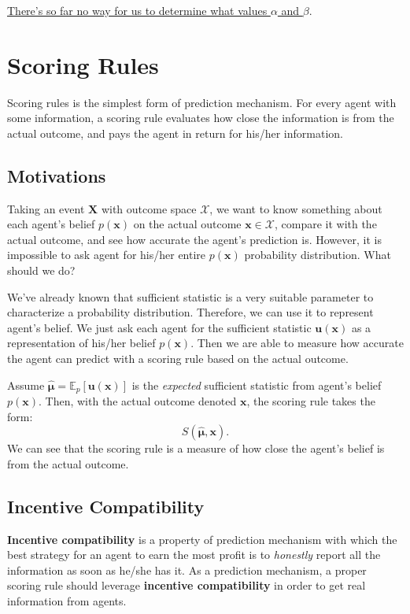 \documentclass[12pt]{article}
\begin{document}
\underline{There's so far no way for us to determine what values $\alpha$ and $\beta$}.
\newpage
\section{Scoring Rules}
Scoring rules is the simplest form of prediction mechanism. For every agent with some information, a scoring rule evaluates how close the information is from the actual outcome, and pays the agent in return for his/her information.

\subsection{Motivations}
Taking an event $\mathbf{X}$ with outcome space $\mathcal{X}$, we want to know something about each agent's belief $p(\mathbf{x})$ on the actual outcome $\mathbf{x}\in \mathcal{X}$, compare it with the actual outcome, and see how accurate the agent's prediction is. However, it is impossible to ask agent for his/her entire $p(\mathbf{x})$ probability distribution. What should we do?

We've already known that sufficient statistic is a very suitable parameter to characterize a probability distribution. Therefore, we can use it to represent agent's belief. We just ask each agent for the sufficient statistic $\mathbf{u}(\mathbf{x})$ as a representation of his/her belief $p(\mathbf{x})$. Then we are able to measure how accurate the agent can predict with a scoring rule based on the actual outcome.

Assume $\bm{\hat{\mu}}=\mathbb{E}_p[\mathbf{u}(\mathbf{x})]$ is the \textit{expected} sufficient statistic from agent's belief $p(\mathbf{x})$. Then, with the actual outcome denoted $\mathbf{x}$, the scoring rule takes the form:
\[S(\bm{\hat{\mu}},\mathbf{x}).\]
We can see that the scoring rule is a measure of how close the agent's belief is from the actual outcome.

\subsection{Incentive Compatibility}
\textbf{Incentive compatibility} is a property of prediction mechanism with which the best strategy for an agent to earn the most profit is to \textit{honestly} report all the information as soon as he/she has it. As a prediction mechanism, a proper scoring rule should leverage \textbf{incentive compatibility} in order to get real information from agents.
\end{document}
